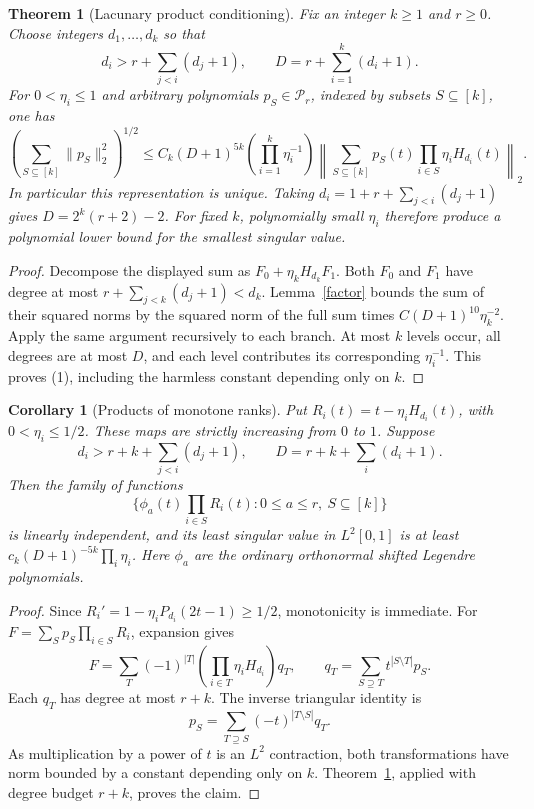 \documentclass[11pt]{article}
\newtheorem{theorem}{Theorem}
\newtheorem{corollary}{Corollary}
\newcommand{\PP}{\mathcal P}
\begin{document}
\begin{theorem}[Lacunary product conditioning]\label{main}
Fix an integer $k\ge1$ and $r\ge0$. Choose integers $d_1,\ldots,d_k$
so that
\[
 d_i>r+\sum_{j<i}(d_j+1),
 \qquad D=r+\sum_{i=1}^k(d_i+1).
\]
For $0<\eta_i\le1$ and arbitrary polynomials $p_S\in\PP_r$,
indexed by subsets $S\subseteq[k]$, one has
\[
 \left(\sum_{S\subseteq[k]}\|p_S\|_2^2\right)^{1/2}
 \le C_k(D+1)^{5k}\left(\prod_{i=1}^k\eta_i^{-1}\right)
 \left\|\sum_{S\subseteq[k]}p_S(t)
                  \prod_{i\in S}\eta_iH_{d_i}(t)\right\|_2.
 \tag{1}
\]
In particular this representation is unique.
Taking $d_i=1+r+\sum_{j<i}(d_j+1)$ gives
$D=2^k(r+2)-2$. For fixed $k$, polynomially small $\eta_i$ therefore
produce a polynomial lower bound for the smallest singular value.
\end{theorem}
\begin{proof}
Decompose the displayed sum as $F_0+\eta_kH_{d_k}F_1$.
Both $F_0$ and $F_1$ have degree at most
$r+\sum_{j<k}(d_j+1)<d_k$. Lemma~\ref{factor} bounds the sum of
their squared norms by the squared norm of the full sum times
$C(D+1)^{10}\eta_k^{-2}$. Apply the same argument recursively to
each branch. At most $k$ levels occur, all degrees are at most $D$,
and each level contributes its corresponding $\eta_i^{-1}$.
This proves (1), including the harmless constant depending only on $k$.
\end{proof}

\begin{corollary}[Products of monotone ranks]\label{ranks}
Put $R_i(t)=t-\eta_iH_{d_i}(t)$, with $0<\eta_i\le1/2$.
These maps are strictly increasing from $0$ to $1$.
Suppose
\[
 d_i>r+k+\sum_{j<i}(d_j+1),\qquad
 D=r+k+\sum_i(d_i+1).
\]
Then the family of functions
\[
 \{\phi_a(t)\prod_{i\in S}R_i(t):0\le a\le r,\ S\subseteq[k]\}
\]
is linearly independent, and its least singular value in $L^2[0,1]$
is at least
$c_k(D+1)^{-5k}\prod_i\eta_i$.
Here $\phi_a$ are the ordinary orthonormal shifted Legendre polynomials.
\end{corollary}
\begin{proof}
Since $R_i'=1-\eta_iP_{d_i}(2t-1)\ge1/2$, monotonicity is immediate.
For $F=\sum_S p_S\prod_{i\in S}R_i$, expansion gives
\[
 F=\sum_T(-1)^{|T|}\left(\prod_{i\in T}\eta_iH_{d_i}\right)q_T,
 \qquad q_T=\sum_{S\supseteq T}t^{|S\setminus T|}p_S.
\]
Each $q_T$ has degree at most $r+k$. The inverse triangular identity is
\[
 p_S=\sum_{T\supseteq S}(-t)^{|T\setminus S|}q_T.
\]
As multiplication by a power of $t$ is an $L^2$ contraction, both
transformations have norm bounded by a constant depending only on $k$.
Theorem~\ref{main}, applied with degree budget $r+k$, proves the claim.
\end{proof}
\end{document}
